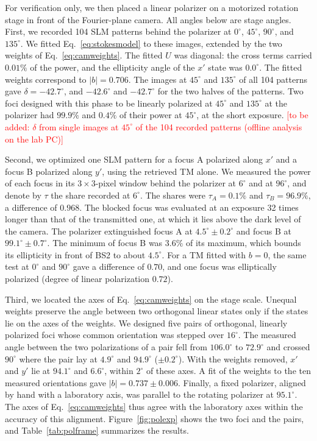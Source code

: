 \documentclass{article}
\newcommand{\note}[1]{\textcolor{red}{[#1]}}
\begin{document}
For verification only, we then placed a linear polarizer on a motorized rotation stage in front of the Fourier-plane camera.
All angles below are stage angles.
First, we recorded 104 SLM patterns behind the polarizer at $0^\circ$, $45^\circ$, $90^\circ$, and $135^\circ$.
We fitted Eq.~\eqref{eq:stokesmodel} to these images, extended by the two weights of Eq.~\eqref{eq:camweights}.
The fitted $U$ was diagonal: the cross terms carried $0.01\%$ of the power, and the ellipticity angle of the $x'$ state was $0.0^\circ$.
The fitted weights correspond to $|b|=0.706$.
The images at $45^\circ$ and $135^\circ$ of all 104 patterns gave $\delta=-42.7^\circ$, and $-42.6^\circ$ and $-42.7^\circ$ for the two halves of the patterns.
Two foci designed with this phase to be linearly polarized at $45^\circ$ and $135^\circ$ at the polarizer had $99.9\%$ and $0.4\%$ of their power at $45^\circ$, at the short exposure.
\note{to be added: $\delta$ from single images at $45^\circ$ of the 104 recorded patterns (offline analysis on the lab PC)}

Second, we optimized one SLM pattern for a focus A polarized along $x'$ and a focus B polarized along $y'$, using the retrieved TM alone.
We measured the power of each focus in its $3\times3$-pixel window behind the polarizer at $6^\circ$ and at $96^\circ$, and denote by $\tau$ the share recorded at $6^\circ$.
The shares were $\tau_A=0.1\%$ and $\tau_B=96.9\%$, a difference of $0.968$.
The blocked focus was evaluated at an exposure 32 times longer than that of the transmitted one, at which it lies above the dark level of the camera.
The polarizer extinguished focus A at $4.5^\circ\pm0.2^\circ$ and focus B at $99.1^\circ\pm0.7^\circ$.
The minimum of focus B was $3.6\%$ of its maximum, which bounds its ellipticity in front of BS2 to about $4.5^\circ$.
For a TM fitted with $b=0$, the same test at $0^\circ$ and $90^\circ$ gave a difference of $0.70$, and one focus was elliptically polarized (degree of linear polarization $0.72$).

Third, we located the axes of Eq.~\eqref{eq:camweights} on the stage scale.
Unequal weights preserve the angle between two orthogonal linear states only if the states lie on the axes of the weights.
We designed five pairs of orthogonal, linearly polarized foci whose common orientation was stepped over $16^\circ$.
The measured angle between the two polarizations of a pair fell from $106.0^\circ$ to $72.9^\circ$ and crossed $90^\circ$ where the pair lay at $4.9^\circ$ and $94.9^\circ$ ($\pm0.2^\circ$).
With the weights removed, $x'$ and $y'$ lie at $94.1^\circ$ and $6.6^\circ$, within $2^\circ$ of these axes.
A fit of the weights to the ten measured orientations gave $|b|=0.737\pm0.006$.
Finally, a fixed polarizer, aligned by hand with a laboratory axis, was parallel to the rotating polarizer at $95.1^\circ$.
The axes of Eq.~\eqref{eq:camweights} thus agree with the laboratory axes within the accuracy of this alignment.
Figure~\ref{fig:polexp} shows the two foci and the pairs, and Table~\ref{tab:polframe} summarizes the results.
\end{document}
